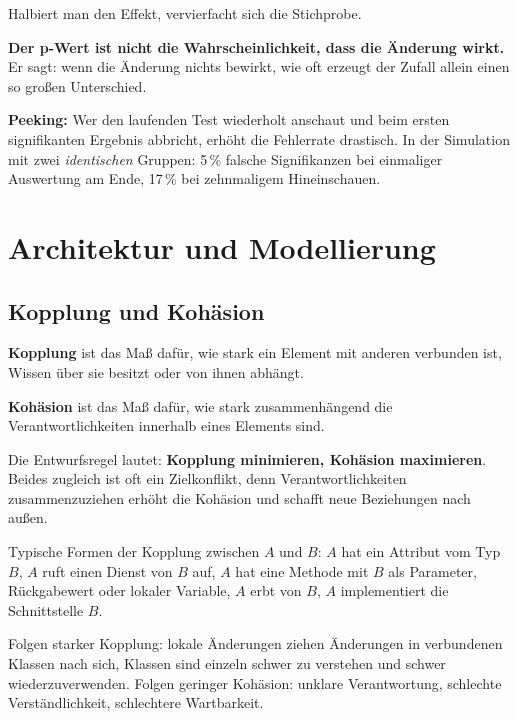 \documentclass[12pt, a4paper]{article}
\begin{document}
Halbiert man den Effekt, vervierfacht sich die Stichprobe.

\begin{notebox}
\textbf{Der p-Wert ist nicht die Wahrscheinlichkeit, dass die Änderung wirkt.} Er sagt:
wenn die Änderung nichts bewirkt, wie oft erzeugt der Zufall allein einen so großen
Unterschied.
\end{notebox}

\textbf{Peeking:} Wer den laufenden Test wiederholt anschaut und beim ersten
signifikanten Ergebnis abbricht, erhöht die Fehlerrate drastisch. In der Simulation
mit zwei \emph{identischen} Gruppen: 5\,\% falsche Signifikanzen bei einmaliger
Auswertung am Ende, 17\,\% bei zehnmaligem Hineinschauen.

\section{Architektur und Modellierung}

\subsection{Kopplung und Kohäsion}

\begin{definitionbox}
\textbf{Kopplung} ist das Maß dafür, wie stark ein Element mit anderen verbunden ist,
Wissen über sie besitzt oder von ihnen abhängt.

\textbf{Kohäsion} ist das Maß dafür, wie stark zusammenhängend die
Verantwortlichkeiten innerhalb eines Elements sind.
\end{definitionbox}

Die Entwurfsregel lautet: \textbf{Kopplung minimieren, Kohäsion maximieren}. Beides
zugleich ist oft ein Zielkonflikt, denn Verantwortlichkeiten zusammenzuziehen erhöht
die Kohäsion und schafft neue Beziehungen nach außen.

Typische Formen der Kopplung zwischen $A$ und $B$: $A$ hat ein Attribut vom Typ $B$,
$A$ ruft einen Dienst von $B$ auf, $A$ hat eine Methode mit $B$ als Parameter,
Rückgabewert oder lokaler Variable, $A$ erbt von $B$, $A$ implementiert die
Schnittstelle $B$.

Folgen starker Kopplung: lokale Änderungen ziehen Änderungen in verbundenen Klassen
nach sich, Klassen sind einzeln schwer zu verstehen und schwer wiederzuverwenden.
Folgen geringer Kohäsion: unklare Verantwortung, schlechte Verständlichkeit,
schlechtere Wartbarkeit.
\end{document}
